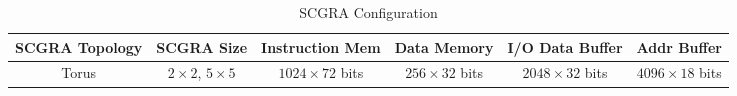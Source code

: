 \begin{table*}[htpb]
\caption{SCGRA Configuration}
\label{tab:scgra-config}
\centering
\begin{tabular}{c|c|c|c|c|c}

\hline
{SCGRA Topology} & {SCGRA Size} & {Instruction Mem} & {Data Memory} & {I/O Data Buffer} & {Addr Buffer} \\ \hline
{Torus} & {$2 \times 2$, $5 \times 5$} & {$1024 \times 72$ bits} & {$256 \times 32$ bits} & {$2048 \times 32$ bits} & {$4096 \times 18$ bits} \\ \hline


\end{tabular}
\end{table*}

